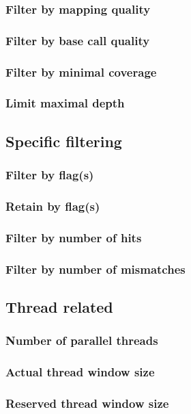 \documentclass[10pt,a4paper]{article}
\begin{document}
\subsubsection{Filter by mapping quality}

\subsubsection{Filter by base call quality}

\subsubsection{Filter by minimal coverage}

\subsubsection{Limit maximal depth}

\subsection{Specific filtering}
\subsubsection{Filter by flag(s)}
\subsubsection{Retain by flag(s)}

\subsubsection{Filter by number of hits}

\subsubsection{Filter by number of mismatches}

% 
\subsection{Thread related}
\subsubsection{Number of parallel threads}

\subsubsection{Actual thread window size}

\subsubsection{Reserved thread window size}

%
\end{document}
